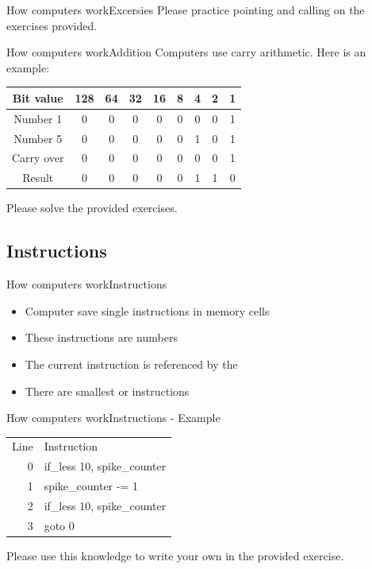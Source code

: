 \documentclass[aspectratio=169]{beamer}
\begin{document}
\begin{frame}{How computers work}{Excersies}
Please practice pointing and calling on the exercises provided.
\end{frame}

\begin{frame}{How computers work}{Addition}
Computers use carry arithmetic.
Here is an example:
\vspace{2em}

\begin{tabular}{ccccccccc}
Bit value  & 128 & 64 & 32 & 16 & 8 & 4 & 2 & 1 \\
\midrule
Number 1   & 0   &  0 &  0 &  0 & 0 & 0 & 0 & 1 \\
Number 5   & 0   &  0 &  0 &  0 & 0 & 1 & 0 & 1 \\
Carry over & 0   &  0 &  0 &  0 & 0 & 0 & 0 & 1 \\
\midrule
Result     & 0   &  0 &  0 &  0 & 0 & 1 & 1 & 0 \\
\end{tabular}

\pause

Please solve the provided exercises.

\end{frame}

\subsection{Instructions}
\begin{frame}{How computers work}{Instructions}
\begin{itemize}
	\item Computer save single instructions in memory cells
	\item These instructions are numbers
	\item The current instruction is referenced by the 
	\item There are smallest or  instructions
\end{itemize}
\end{frame}

\begin{frame}{How computers work}{Instructions - Example}
\begin{tabular}{rl}
	Line & Instruction \\
	0    & if\_less 10, spike\_counter \\
	1    & \phantom{tab1} spike\_counter -= 1 \\
	2    & if\_less 10, spike\_counter \\
	3    & \phantom{tab1} goto 0 \\
\end{tabular}

\vspace{2em}

Please use this knowledge to write your own  in the provided exercise.

\end{frame}
\end{document}
